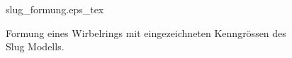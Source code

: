 \begin{figure}
\centering
\def\svgwidth{0.9\columnwidth}
{slug_formung.eps_tex}
\caption{Formung eines Wirbelrings mit eingezeichneten Kenngrössen des Slug Modells. \label{Wirbelringe:fig:slug_formung}}
\end{figure}